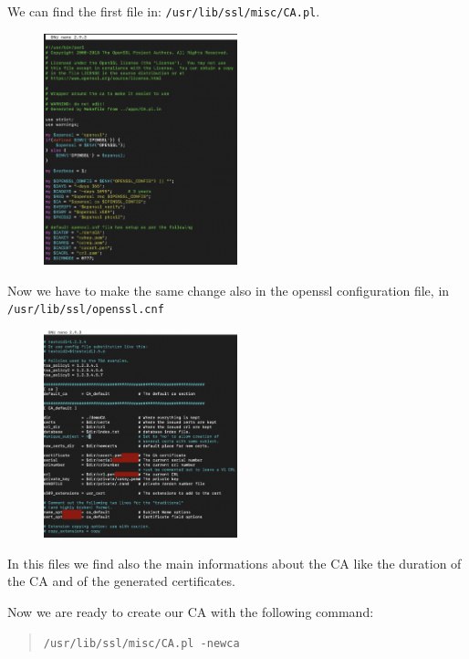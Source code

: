 \documentclass[11pt]{article}
\begin{document}
\newpage
We can find the first file in: \texttt{/usr/lib/ssl/misc/CA.pl}.

\begin{figure}[!ht]
  \centering
  \includegraphics[width=0.5\textwidth]{pic1-hw6-7-1635747.png}
  \label{fig:capl}
\end{figure}

Now we have to make the same change also in the openssl configuration file, in \texttt{/usr/lib/ssl/openssl.cnf}

\begin{figure}[!ht]
  \centering
  \includegraphics[width=0.5\textwidth]{pic2-hw6-7-1635747.png}
  \label{fig:conf}
\end{figure}

In this files we find also the main informations about the CA like the duration of the CA and of the generated certificates.

\newpage
Now we are ready to create our CA with the following command:

\begin{quote}
  \texttt{/usr/lib/ssl/misc/CA.pl -newca}
\end{quote}
\end{document}
